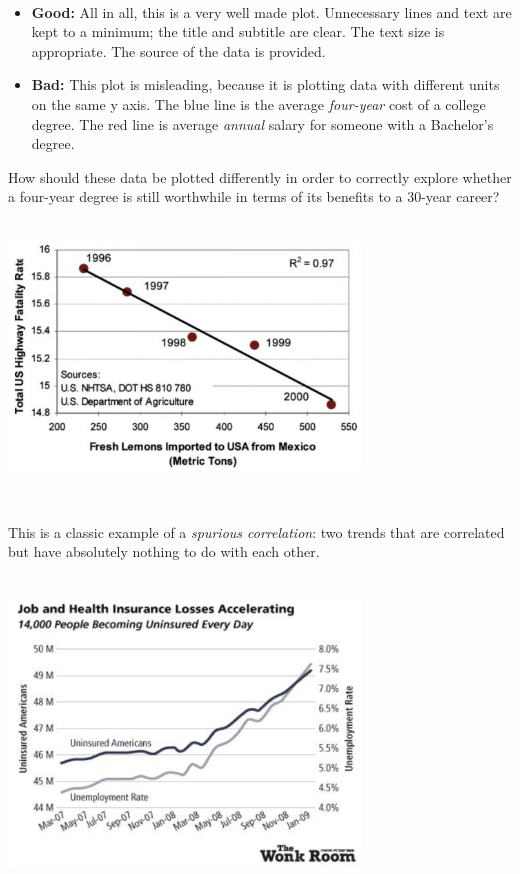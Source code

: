 \documentclass[
]{book}
\begin{document}
~

\begin{itemize}
\item
  \textbf{Good:} All in all, this is a very well made plot. Unnecessary lines and text are kept to a minimum; the title and subtitle are clear. The text size is appropriate. The source of the data is provided.
\item
  \textbf{Bad:} This plot is misleading, because it is plotting data with different units on the same y axis. The blue line is the average \emph{four-year} cost of a college degree. The red line is average \emph{annual} salary for someone with a Bachelor's degree.
\end{itemize}

How should these data be plotted differently in order to correctly explore whether a four-year degree is still worthwhile in terms of its benefits to a 30-year career?

~\\

\includegraphics[width=0.7\textwidth,height=\textheight]{img/vis20.png}

~

This is a classic example of a \emph{spurious correlation}: two trends that are correlated but have absolutely nothing to do with each other.

~\\

\includegraphics[width=0.7\textwidth,height=\textheight]{img/vis21.png}
\end{document}
